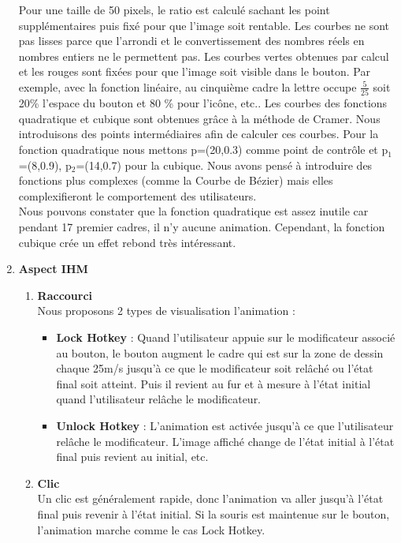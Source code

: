 \documentclass[12pt,a4paper]{article}
\begin{document}
\begin{enumerate}
\begin{center}
\end{center}
Pour une taille de 50 pixels, le ratio est calculé sachant les point supplémentaires puis fixé pour que l'image soit rentable.
Les courbes ne sont pas lisses parce que l'arrondi et le convertissement des nombres réels en nombres entiers ne le permettent pas. Les courbes vertes obtenues par calcul et les rouges sont fixées pour que l'image soit visible dans le bouton. Par exemple, avec la fonction linéaire, au cinquième cadre la lettre occupe $\frac{5}{25}$ soit 20\% l'espace du bouton et 80 \% pour l'icône, etc.. Les courbes des fonctions quadratique et cubique sont obtenues grâce à la méthode de Cramer. Nous introduisons des points intermédiaires afin de calculer ces courbes. Pour la fonction quadratique nous mettons p=(20,0.3) comme point de contrôle et p$_1$=(8,0.9), p$_2$=(14,0.7) pour la cubique.
Nous avons pensé à introduire des fonctions plus complexes (comme la Courbe de Bézier) mais elles complexifieront le comportement des utilisateurs.\\
Nous pouvons constater que la fonction quadratique est assez inutile car pendant 17 premier cadres, il n'y aucune animation. Cependant, la fonction cubique crée un effet rebond très intéressant.
\item {\large \textbf{Aspect IHM}}\\
\begin{enumerate}
\item {\large \textbf{Raccourci}}\\
Nous proposons 2 types de visualisation l'animation :
\begin{itemize}
\item \textbf{Lock Hotkey} : Quand l'utilisateur appuie sur le modificateur associé au bouton, le bouton augment le cadre qui est sur la zone de dessin chaque 25m/s jusqu'à ce que le modificateur soit relâché ou l'état final soit atteint. Puis il revient au fur et à mesure à l'état initial quand l'utilisateur relâche le modificateur.
\item \textbf{Unlock Hotkey} : L'animation est activée jusqu'à ce que l'utilisateur relâche le modificateur. L'image affiché change de l'état initial à l'état final puis revient au initial, etc.
\end{itemize}
\item {\large \textbf{Clic}}\\
Un clic est généralement rapide, donc l'animation va aller jusqu'à l'état final puis revenir à l'état initial. Si la souris est maintenue sur le bouton, l'animation marche comme le cas Lock Hotkey.

\end{enumerate}
\end{enumerate}
\end{document}
